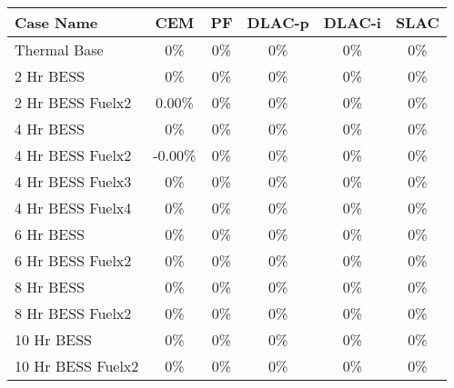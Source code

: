 \begin{tabular}{lccccc}
\toprule
Case Name & CEM & PF & DLAC-p & DLAC-i & SLAC \\
\midrule
Thermal Base & 0\% & 0\% & 0\% & 0\% & 0\% \\
2 Hr BESS & 0\% & 0\% & 0\% & 0\% & 0\% \\
2 Hr BESS Fuelx2 & 0.00\% & 0\% & 0\% & 0\% & 0\% \\
4 Hr BESS & 0\% & 0\% & 0\% & 0\% & 0\% \\
4 Hr BESS Fuelx2 & -0.00\% & 0\% & 0\% & 0\% & 0\% \\
4 Hr BESS Fuelx3 & 0\% & 0\% & 0\% & 0\% & 0\% \\
4 Hr BESS Fuelx4 & 0\% & 0\% & 0\% & 0\% & 0\% \\
6 Hr BESS & 0\% & 0\% & 0\% & 0\% & 0\% \\
6 Hr BESS Fuelx2 & 0\% & 0\% & 0\% & 0\% & 0\% \\
8 Hr BESS & 0\% & 0\% & 0\% & 0\% & 0\% \\
8 Hr BESS Fuelx2 & 0\% & 0\% & 0\% & 0\% & 0\% \\
10 Hr BESS & 0\% & 0\% & 0\% & 0\% & 0\% \\
10 Hr BESS Fuelx2 & 0\% & 0\% & 0\% & 0\% & 0\% \\
\bottomrule
\end{tabular}
